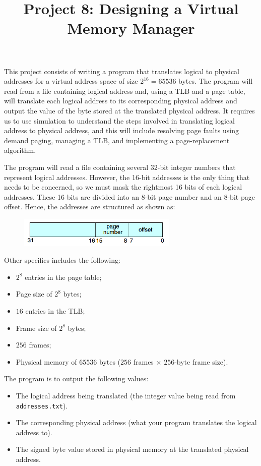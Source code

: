\documentclass[UTF8,10pt,a4paper]{article}
\title{Project 8: Designing a Virtual Memory Manager}
\date{}
\theoremstyle{Problem}
\theoremstyle{Solution}
\begin{document}
\maketitle
\thispagestyle{FirstPageStyle}




This project consists of writing a program that translates logical to physical addresses for a virtual address space of size $2^{16} = 65536$ bytes. The program will read from a file containing logical address and, using a TLB and a page table, will translate each logical address to its corresponding physical address and output the value of the byte stored at the translated physical address. It requires us to use simulation to understand the steps involved in translating logical address to physical address, and this will include resolving page faults using demand paging, managing a TLB, and implementing a page-replacement algorithm.

The program will read a file containing several 32-bit integer numbers that represent logical addresses. However, the 16-bit addresses is the only thing that needs to be concerned, so we must mask the rightmost 16 bits of each logical addresses. These 16 bits are divided into an 8-bit page number and an 8-bit page offset. Hence, the addresses are structured as shown as:
\begin{figure}[htbp]
  \centering
  \includegraphics[width=3in]{pic0.png}
\end{figure}

Other specifics includes the following:
\begin{itemize}
  \item $2^8$ entries in the page table;
  \item Page size of $2^8$ bytes;
  \item $16$ entries in the TLB;
  \item Frame size of $2^8$ bytes;
  \item $256$ frames;
  \item Physical memory of $65536$ bytes ($256$ frames $\times$ $256$-byte frame size).
\end{itemize}

The program is to output the following values:
\begin{itemize}
\item The logical address being translated (the integer value being read from \texttt{addresses.txt}).
\item The corresponding physical address (what your program translates the logical address to).
\item The signed byte value stored in physical memory at the translated physical address.
\end{itemize}
\end{document}
